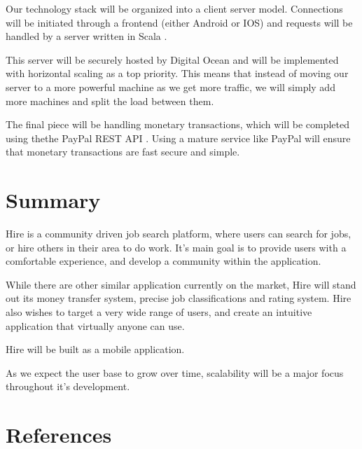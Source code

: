 \documentclass[11pt]{article}
\begin{document}
Our technology stack will be organized into a client server model. 
Connections will be initiated through a frontend (either Android or IOS) and requests will be handled by a server written in Scala \cite{scala}. 

This server will be securely hosted by Digital Ocean and will be implemented with horizontal scaling as a top priority. This means that instead of moving our server to a more powerful machine as we get more traffic, we will simply add more machines and split the load between them.

The final piece will be handling monetary transactions, which will be completed using thethe PayPal REST API \cite{paypal}. Using a mature service like PayPal will ensure that monetary transactions are fast secure and simple.

%
\section{Summary}

Hire is a community driven job search platform, where users can search for jobs, or hire others in their area to do work. It's main goal is to provide users with a comfortable experience, and develop a community within the application. 

While there are other similar application currently on the market, Hire will stand out its money transfer system, precise job classifications and rating system. Hire also wishes to target a very wide range of users, and create an intuitive application that virtually anyone can use.

Hire will be built as a mobile application.

As we expect the user base to grow over time, scalability will be a major focus throughout it's development. 

 
    \section{References} 
    
    

    
    
    \pagebreak
%  


%
%
%
\end{document}
